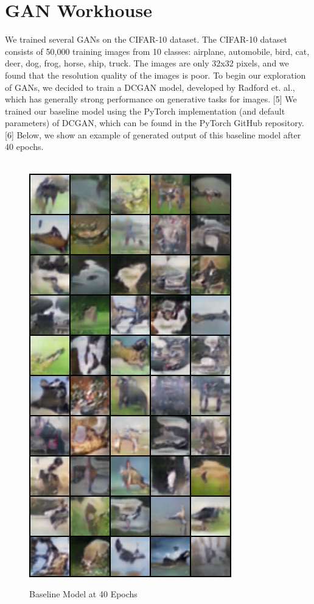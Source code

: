 \documentclass[a4paper]{article}
\begin{document}
\section{GAN Workhouse}

We trained several GANs on the CIFAR-10 dataset. The CIFAR-10 dataset consists of 50,000 training images from 10 classes: airplane, automobile, bird, cat, deer, dog, frog, horse, ship, truck. The images are only 32x32 pixels, and we found that the resolution quality of the images is poor. To begin our exploration of GANs, we decided to train a DCGAN model, developed by Radford et. al., which has generally strong performance on generative tasks for images. [5] We trained our baseline model using the PyTorch implementation (and default parameters) of DCGAN, which can be found in the PyTorch GitHub repository. [6] Below, we show an example of generated output of this baseline model after 40 epochs.
\\
\\
\begin{figure}[H]
  \includegraphics[scale=0.5]{images/baseline_normalized_10x5_generated.png}
  \label{fig:boat1}
  \caption{Baseline Model at 40 Epochs}
\end{figure}
\end{document}
